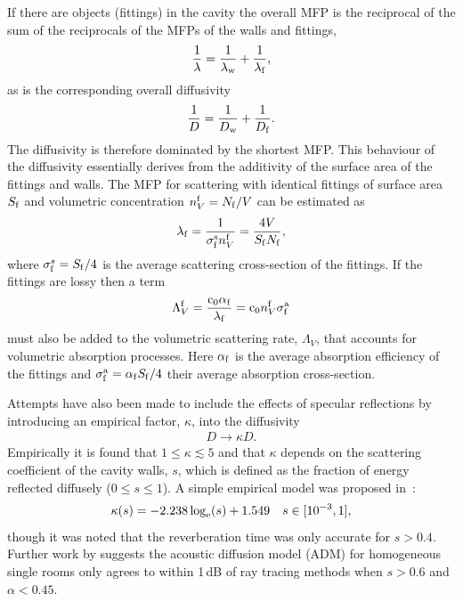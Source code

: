 \documentclass[a4paper]{article}
\numberwithin{equation}{section}
\begin{document}
If there are objects (fittings) in the cavity the overall MFP is the reciprocal of the 
sum of the reciprocals of the MFPs of the walls and fittings,
\begin{align}
\label{eq:harmmean}
\frac{1}{\lambda} = \frac{1}{\lambda_{\mathrm{w}}} + \frac{1}{\lambda_{\mathrm{f}}},
\end{align}
as is the corresponding overall diffusivity~\citep{Valeau2007}
\begin{align}
\frac{1}{D} = \frac{1}{D_{\mathrm{w}}} + \frac{1}{D_{\mathrm{f}}}.
\end{align}
The diffusivity is therefore dominated by the shortest MFP. This behaviour
of the diffusivity essentially derives from the additivity of the surface area
of the fittings and walls. The MFP for scattering with identical fittings of 
surface area $S_{\mathrm{f}}$ and volumetric
concentration $n_V^{\mathrm{f}}=N_{\mathrm{f}}/V$ can be estimated as~\citep{Valeau2007}
\begin{align}
\lambda_{\mathrm{f}} = \frac{1}{\sigma_{\mathrm{f}}^{\mathrm{s}} n_V^{\mathrm{f}}} = \frac{4V}{S_{\mathrm{f}} N_{\mathrm{f}}},
\end{align}
where $\sigma_{\mathrm{f}}^s=S_{\mathrm{f}}/4$ is the average scattering cross-section of the
fittings. If the fittings are lossy then a term
\begin{align}
\Lambda_V^{\mathrm{f}} = \frac{\mathrm{c}_0\alpha_{\mathrm{f}}}{\lambda_{\mathrm{f}}} = \mathrm{c}_0 n_V^{\mathrm{f}} \sigma_{\mathrm{f}}^{\mathrm{a}}
\end{align}
must also be added to the volumetric scattering rate, $\Lambda_V$, that accounts
for volumetric absorption processes. Here $\alpha_{\mathrm{f}}$ is the average
absorption efficiency of the fittings and $\sigma_{\mathrm{f}}^{\mathrm{a}}=\alpha_{\mathrm{f}} S_{\mathrm{f}}/4$ their
average absorption cross-section.

Attempts have also been made to include the effects of specular reflections by
introducing an empirical factor, ${\kappa}$, into the diffusivity~\citep{Foy2009} 
\begin{align}
\label{eq:kappa}
D \rightarrow \kappa D .
\end{align}
Empirically it is found that $1\leq\kappa\lesssim 5$ and that $\kappa$ depends on the 
scattering coefficient of the cavity walls, $s$, which is defined as the fraction
of energy reflected diffusely ($0 \leq s \leq 1$). A simple empirical model was proposed
in~\citep{Foy2009}:
\begin{align}
\kappa(s) = -2.238\log_{\mathrm{e}}(s) + 1.549 \,\,\,\,\,\,s\in [10^{-3},1],
\end{align}
though it was noted that the reverberation time was only accurate for $s>0.4$. Further
work by \cite{Navarro2013} suggests the acoustic diffusion model (ADM) for homogeneous single 
rooms only agrees to within 1\,dB of ray tracing methods when $s>0.6$ and $\alpha<0.45$.
\end{document}
